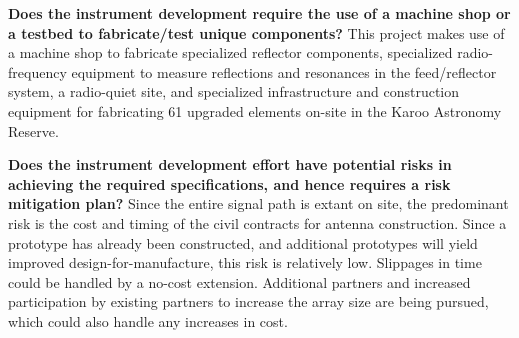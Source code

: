 \documentclass[preprint]{aastex}
\begin{document}
{\bf Does the instrument development require the use of a machine shop or a testbed to fabricate/test unique components?}
This project makes use of a machine shop to fabricate specialized reflector components, specialized radio-frequency
equipment to measure reflections and resonances in the feed/reflector system, a
radio-quiet site, and specialized infrastructure and construction equipment for fabricating
61 upgraded elements on-site in the Karoo Astronomy Reserve.

{\bf Does the instrument development effort have potential risks in achieving the required specifications, 
and hence requires a risk mitigation plan?}
Since the entire signal path is extant on site, the predominant risk is the cost and timing of the civil contracts for 
antenna construction.  Since a prototype has already been constructed, and additional prototypes will yield 
improved design-for-manufacture, this risk is relatively low.  Slippages in time could be
handled by a no-cost extension.  Additional partners and increased participation by existing partners to 
increase the array size are being pursued, which could also handle any increases in cost.


%
\end{document}
